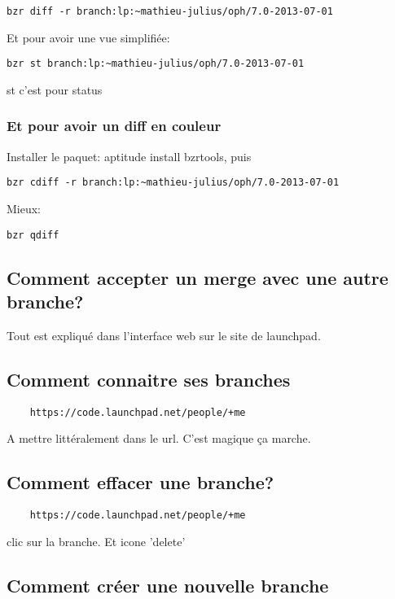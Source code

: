 \documentclass[12pt,a4paper]{article}
\begin{document}
\begin{verbatim}
bzr diff -r branch:lp:~mathieu-julius/oph/7.0-2013-07-01
\end{verbatim}

Et pour avoir une vue simplifiée:
\begin{verbatim}
bzr st branch:lp:~mathieu-julius/oph/7.0-2013-07-01
\end{verbatim}
st c'est pour status

\subsubsection{Et pour avoir un diff en couleur}
\label{sec:diffcolor}

Installer le paquet: aptitude install bzrtools, puis
\begin{verbatim}
bzr cdiff -r branch:lp:~mathieu-julius/oph/7.0-2013-07-01
\end{verbatim}

Mieux:
\begin{verbatim}
bzr qdiff
\end{verbatim}

\subsection{Comment accepter un merge avec une autre branche?}
\label{sec:mergebranch}

Tout est expliqué dans l'interface web sur le site de launchpad. 

\subsection{Comment connaitre ses branches}
\label{sec:my_branches}

\begin{verbatim}
    https://code.launchpad.net/people/+me
\end{verbatim}
A mettre littéralement dans le url. C'est magique ça marche.

\subsection{Comment effacer une branche?}
\label{sec:branch_delete}
\begin{verbatim}
    https://code.launchpad.net/people/+me
\end{verbatim}
clic sur la branche. Et icone 'delete'

\subsection{Comment créer une nouvelle branche}
\label{sec:create_branch}
\end{document}
